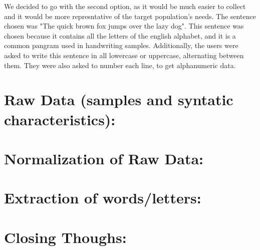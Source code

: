 \documentclass[twoside,a4paper]{article}
\begin{document}
We decided to go with the second option, as it would be much easier to collect and it would be more represntative of the target population's needs.
The sentence chosen was "The quick brown fox jumps over the lazy dog". This sentence was chosen because it contains all the letters of the english alphabet, and it is a common pangram used in handwriting samples.
Additionally, the users were asked to write this sentence in all lowercase or uppercase, alternating between them. They were also asked to number each line, to get alphanumeric data.
\section{Raw Data (samples and syntatic characteristics): }

\section{Normalization of Raw Data: }
\section{Extraction of words/letters: }
\section{Closing Thoughs: }
\printbibliography
\end{document}
